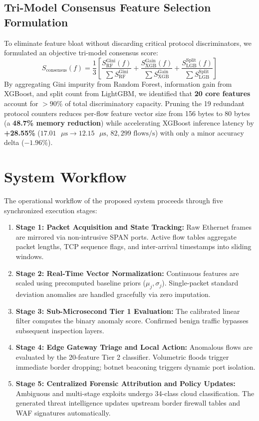 \documentclass[12pt,a4paper]{report}
\begin{document}
\subsection{Tri-Model Consensus Feature Selection Formulation}
To eliminate feature bloat without discarding critical protocol discriminators, we formulated an objective tri-model consensus score:
\begin{equation}
    S_{\text{consensus}}(f) = \frac{1}{3} \left[ \frac{S_{\text{RF}}^{\text{Gini}}(f)}{\sum S_{\text{RF}}^{\text{Gini}}} + \frac{S_{\text{XGB}}^{\text{Gain}}(f)}{\sum S_{\text{XGB}}^{\text{Gain}}} + \frac{S_{\text{LGB}}^{\text{Split}}(f)}{\sum S_{\text{LGB}}^{\text{Split}}} \right]
\end{equation}
By aggregating Gini impurity from Random Forest, information gain from XGBoost, and split count from LightGBM, we identified that \textbf{20 core features} account for $>90\%$ of total discriminatory capacity. Pruning the 19 redundant protocol counters reduces per-flow feature vector size from 156 bytes to 80 bytes (a \textbf{48.7\% memory reduction}) while accelerating XGBoost inference latency by \textbf{+28.55\%} ($17.01\text{ }\mu\text{s} \to 12.15\text{ }\mu\text{s}$, $82,299\text{ flows/s}$) with only a minor accuracy delta ($-1.96\%$).

\section{System Workflow}
The operational workflow of the proposed system proceeds through five synchronized execution stages:
\begin{enumerate}
    \item \textbf{Stage 1: Packet Acquisition and State Tracking:} Raw Ethernet frames are mirrored via non-intrusive SPAN ports. Active flow tables aggregate packet lengths, TCP sequence flags, and inter-arrival timestamps into sliding windows.
    \item \textbf{Stage 2: Real-Time Vector Normalization:} Continuous features are scaled using precomputed baseline priors ($\mu_j, \sigma_j$). Single-packet standard deviation anomalies are handled gracefully via zero imputation.
    \item \textbf{Stage 3: Sub-Microsecond Tier 1 Evaluation:} The calibrated linear filter computes the binary anomaly score. Confirmed benign traffic bypasses subsequent inspection layers.
    \item \textbf{Stage 4: Edge Gateway Triage and Local Action:} Anomalous flows are evaluated by the 20-feature Tier 2 classifier. Volumetric floods trigger immediate border dropping; botnet beaconing triggers dynamic port isolation.
    \item \textbf{Stage 5: Centralized Forensic Attribution and Policy Updates:} Ambiguous and multi-stage exploits undergo 34-class cloud classification. The generated threat intelligence updates upstream border firewall tables and WAF signatures automatically.
\end{enumerate}
\end{document}
